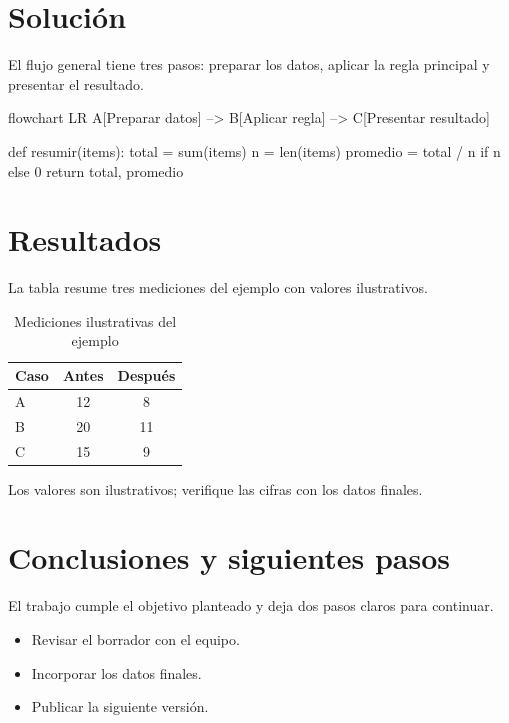 \documentclass[11pt,a4paper]{article}
\begin{document}
  \section{Solución}
  El flujo general tiene tres pasos: preparar los datos, aplicar la regla
  principal y presentar el resultado.
  \begin{mermaid}[style=editorial, width=0.85\linewidth, caption={Flujo general de la solución}, pos=H]
    flowchart LR
    A[Preparar datos] --> B[Aplicar regla] --> C[Presentar resultado]
  \end{mermaid}
  \begin{code}[lang=python, numbers=true]
def resumir(items):
    total = sum(items)
    n = len(items)
    promedio = total / n if n else 0
    return total, promedio
  \end{code}

  \section{Resultados}
  La tabla resume tres mediciones del ejemplo con valores ilustrativos.
  \begin{table}[H]
    \centering
    \caption{Mediciones ilustrativas del ejemplo}
    \begin{tabular}{@{}lcc@{}}
      \toprule
      Caso & Antes & Después \\
      \midrule
      A & 12 & 8 \\
      B & 20 & 11 \\
      C & 15 & 9 \\
      \bottomrule
    \end{tabular}
  \end{table}
  \begin{cuidado}
    Los valores son ilustrativos; verifique las cifras con los datos finales.
  \end{cuidado}

  \section{Conclusiones y siguientes pasos}
  El trabajo cumple el objetivo planteado y deja dos pasos claros para continuar.
  \begin{itemize}[label=$\square$]
    \item Revisar el borrador con el equipo.
    \item Incorporar los datos finales.
    \item Publicar la siguiente versión.
  \end{itemize}
\end{document}
